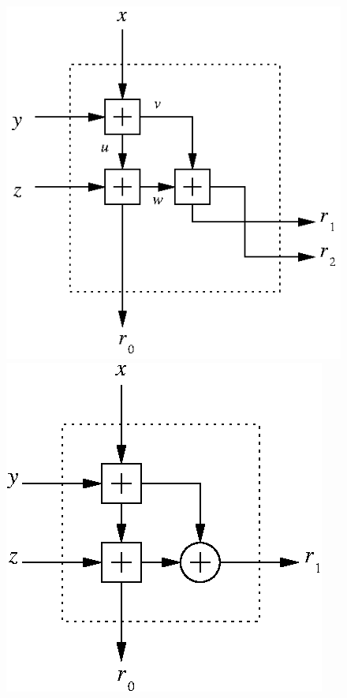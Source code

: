 \documentclass[11pt]{article}
\theoremstyle{definition}
\begin{document}
\begin{figure}
  \begin{center}
    \includegraphics{three-sum.eps} \includegraphics{three-sum-2.eps}

\end{center}
\end{figure}
\end{document}
